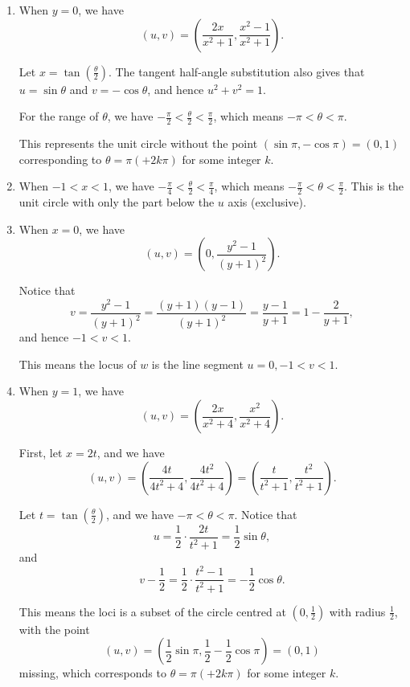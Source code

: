\begin{enumerate}
    \item When \(y = 0\), we have
          \[
              (u, v) = \left(\frac{2x}{x^2 + 1}, \frac{x^2 - 1}{x^2 + 1}\right).
          \]

          Let \(x = \tan \left(\frac{\theta}{2}\right)\). The tangent half-angle substitution also gives that \(u = \sin \theta\) and \(v = -\cos \theta\), and hence \(u^2 + v^2 = 1\).

          For the range of \(\theta\), we have \(-\frac{\pi}{2} < \frac{\theta}{2} < \frac{\pi}{2}\), which means \(-\pi < \theta < \pi\).

          This represents the unit circle without the point \((\sin \pi, - \cos \pi) = (0, 1)\) corresponding to \(\theta = \pi ( + 2k\pi)\) for some integer \(k\).

    \item When \(-1 < x < 1\), we have \(-\frac{\pi}{4} < \frac{\theta}{2} < \frac{\pi}{4}\), which means \(-\frac{\pi}{2} < \theta < \frac{\pi}{2}\). This is the unit circle with only the part below the \(u\) axis (exclusive).

    \item When \(x = 0\), we have
          \[
              (u, v) = \left(0, \frac{y^2 - 1}{(y + 1)^2}\right).
          \]

          Notice that
          \[
              v = \frac{y^2 - 1}{(y + 1)^2} = \frac{(y + 1)(y - 1)}{(y + 1)^2} = \frac{y - 1}{y + 1} = 1 - \frac{2}{y + 1},
          \]
          and hence \(-1 < v < 1\).

          This means the locus of \(w\) is the line segment \(u = 0, -1 < v < 1\).

    \item When \(y = 1\), we have
          \[
              (u, v) = \left(\frac{2x}{x^2 + 4}, \frac{x^2}{x^2 + 4}\right).
          \]

          First, let \(x = 2t\), and we have
          \[
              (u, v) = \left(\frac{4t}{4t^2 + 4}, \frac{4t^2}{4t^2 + 4}\right) = \left(\frac{t}{t^2 + 1}, \frac{t^2}{t^2 + 1}\right).
          \]

          Let \(t = \tan \left(\frac{\theta}{2}\right)\), and we have \(-\pi < \theta < \pi\). Notice that
          \[
              u = \frac{1}{2} \cdot \frac{2t}{t^2 + 1} = \frac{1}{2} \sin \theta,
          \]
          and
          \[
              v - \frac{1}{2} = \frac{1}{2} \cdot \frac{t^2 - 1}{t^2 + 1} = - \frac{1}{2} \cos \theta.
          \]

          This means the loci is a subset of the circle centred at \(\left(0, \frac{1}{2}\right)\) with radius \(\frac{1}{2}\), with the point
          \[
              (u, v) = \left(\frac{1}{2} \sin \pi, \frac{1}{2} - \frac{1}{2} \cos \pi\right) = (0, 1)
          \]
          missing, which corresponds to \(\theta = \pi (+ 2k\pi)\) for some integer \(k\).
\end{enumerate}
